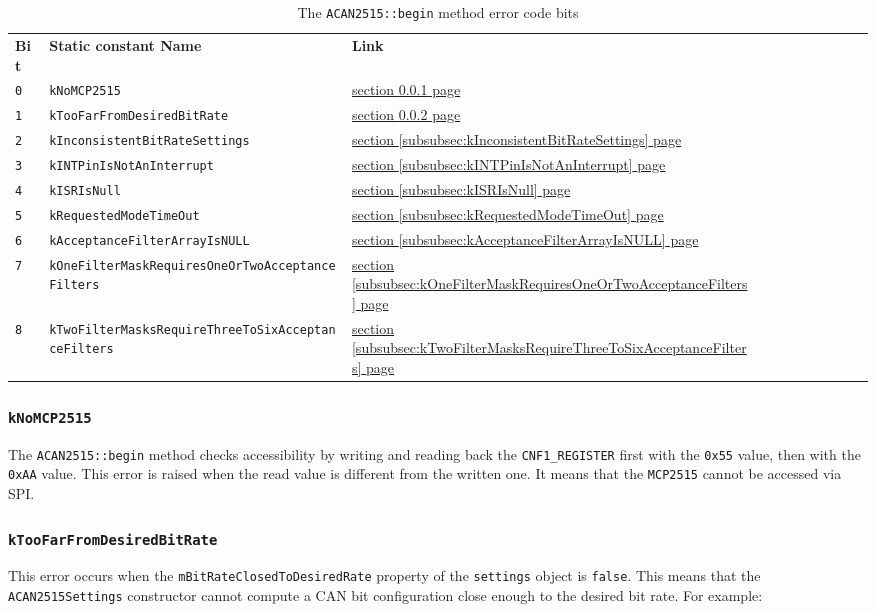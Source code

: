 \documentclass[10pt, a4paper, obeyspaces, openany]{extarticle}
\newcommand \subsubsectionLabel[2]{\subsubsection{#1}\label{subsubsec:#2}}
\newcommand\refSubsubsectionPage[1]{\hyperref[subsubsec:#1]{section \ref*{subsubsec:#1} page \pageref{subsubsec:#1}}}
\newcommand\labelTableau[1]{\label{tab:#1}}
\begin{document}
\begin{table}[!ht]
  \small
  \onehalfspacing
  \centering
  \begin{tabular}{lllllllllp{6cm}l}
    \textbf{Bit} & \textbf{Static constant Name}         & \textbf{Link}\\
    \texttt{0} & \texttt{kNoMCP2515} & \refSubsubsectionPage{kNoMCP2515}\\
    \texttt{1} & \texttt{kTooFarFromDesiredBitRate} & \refSubsubsectionPage{kTooFarFromDesiredBitRate} \\
    \texttt{2} & \texttt{kInconsistentBitRateSettings} & \refSubsubsectionPage{kInconsistentBitRateSettings} \\
    \texttt{3} & \texttt{kINTPinIsNotAnInterrupt} & \refSubsubsectionPage{kINTPinIsNotAnInterrupt} \\
    \texttt{4} & \texttt{kISRIsNull}  & \refSubsubsectionPage{kISRIsNull} \\
    \texttt{5} & \texttt{kRequestedModeTimeOut} & \refSubsubsectionPage{kRequestedModeTimeOut}\\
    \texttt{6} & \texttt{kAcceptanceFilterArrayIsNULL} & \refSubsubsectionPage{kAcceptanceFilterArrayIsNULL} \\
    \texttt{7} & \texttt{kOneFilterMaskRequiresOneOrTwoAcceptanceFilters} & \refSubsubsectionPage{kOneFilterMaskRequiresOneOrTwoAcceptanceFilters} \\
    \texttt{8} & \texttt{kTwoFilterMasksRequireThreeToSixAcceptanceFilters} & \refSubsubsectionPage{kTwoFilterMasksRequireThreeToSixAcceptanceFilters}\\
  \end{tabular}
  \caption{The \texttt{ACAN2515::begin} method error code bits}
  \labelTableau{beginErrorCode}
\end{table}




\subsubsectionLabel{\texttt{kNoMCP2515}}{kNoMCP2515}

The \texttt{ACAN2515::begin} method checks accessibility by writing and reading back the \texttt{CNF1\_REGISTER} first with the \texttt{0x55} value, then with the \texttt{0xAA} value. This error is raised when the read value is different from the written one. It means that the \texttt{MCP2515} cannot be accessed via SPI. 

\subsubsectionLabel{\texttt{kTooFarFromDesiredBitRate}}{kTooFarFromDesiredBitRate}

This error occurs when the \texttt{mBitRateClosedToDesiredRate} property of the \texttt{settings} object is \texttt{false}. This means that the \texttt{ACAN2515Settings} constructor cannot compute a CAN bit configuration close enough to the desired bit rate. For example:
\end{document}
